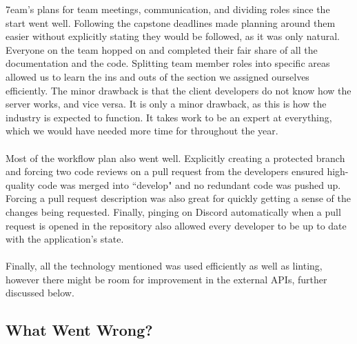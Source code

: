 \documentclass{article}
\begin{document}
\noindent 7eam's plans for team meetings, communication, and dividing roles since the start went well. Following the capstone deadlines made planning around them easier without explicitly stating they would be followed, as it was only natural. Everyone on the team hopped on and completed their fair share of all the documentation and the code. Splitting team member roles into specific areas allowed us to learn the ins and outs of the section we assigned ourselves efficiently. The minor drawback is that the client developers do not know how the server works, and vice versa. It is only a minor drawback, as this is how the industry is expected to function. It takes work to be an expert at everything, which we would have needed more time for throughout the year.
\\~\\ Most of the workflow plan also went well. Explicitly creating a protected branch and forcing two code reviews on a pull request from the developers ensured high-quality code was merged into ``develop" and no redundant code was pushed up. Forcing a pull request description was also great for quickly getting a sense of the changes being requested. Finally, pinging on Discord automatically when a pull request is opened in the repository also allowed every developer to be up to date with the application's state.
\\~\\ Finally, all the technology mentioned was used efficiently as well as linting, however there might be room for improvement in the external APIs, further discussed below.

\subsection{What Went Wrong?}

\end{document}
